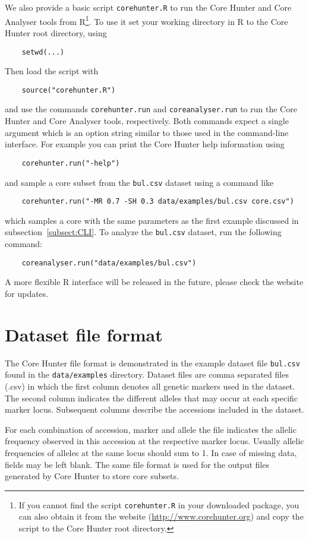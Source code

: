 \documentclass[a4paper, titlepage, 11pt]{article}
\begin{document}
We also provide a basic script \texttt{corehunter.R} to run the Core Hunter and Core Analyser tools from R\footnote{If you cannot find the script \texttt{corehunter.R} in your downloaded package, you can also obtain it from the website (\url{http://www.corehunter.org}) and copy the script to the Core Hunter root directory.}. To use it set your working directory in R to the Core Hunter root directory, using
\begin{verbatim}
    setwd(...)
\end{verbatim}
Then load the script with
\begin{verbatim}
    source("corehunter.R")
\end{verbatim}
and use the commands \texttt{corehunter.run} and \texttt{coreanalyser.run} to run the Core Hunter and Core Analyser tools, respectively. Both commands expect a single argument which is an option string similar to those used in the command-line interface. For example you can print the Core Hunter help information using
\begin{verbatim}
    corehunter.run("-help")
\end{verbatim}
and sample a core subset from the \texttt{bul.csv} dataset using a command like
\begin{verbatim}
    corehunter.run("-MR 0.7 -SH 0.3 data/examples/bul.csv core.csv")
\end{verbatim}
which samples a core with the same parameters as the first example discussed in subsection~\ref{subsect:CLI}. To analyze the \texttt{bul.csv} dataset, run the following command:
\begin{verbatim}
    coreanalyser.run("data/examples/bul.csv")
\end{verbatim}
A more flexible R interface will be released in the future, please check the website for updates.

\section{Dataset file format}

The Core Hunter file format is demonstrated in the example dataset file \texttt{bul.csv} found in the \texttt{data/examples} directory. Dataset files are comma separated files (.csv) in which the first column denotes all genetic markers used in the dataset. The second column indicates the different alleles that may occur at each specific marker locus. Subsequent columns describe the accessions included in the dataset.

For each combination of accession, marker and allele the file indicates the allelic frequency observed in this accession at the respective marker locus. Usually allelic frequencies of alleles at the same locus should sum to 1. In case of missing data, fields may be left blank. The same file format is used for the output files generated by Core Hunter to store core subsets.
\end{document}
